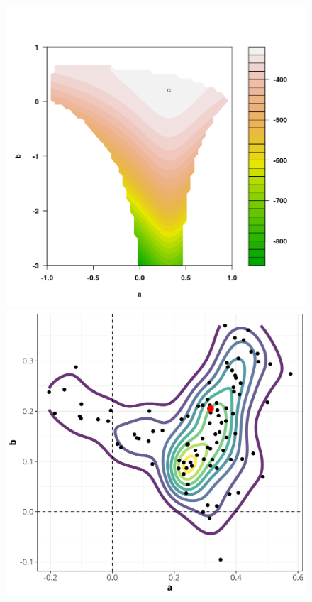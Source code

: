 \documentclass{article}
\numberwithin{equation}{section}
\begin{document}
\begin{figure}[H]
    \centering
    \begin{minipage}{0.55\textwidth}
        \centering
        \includegraphics[width=\textwidth]{plots/Rplot01.png}
    \end{minipage}
    \hfill
    \begin{minipage}{0.44\textwidth}
        \centering
        \includegraphics[width=\textwidth]{plots/044_bootstrap_density.png}

\end{minipage}
\end{figure}
\end{document}
